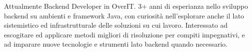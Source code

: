 

\begin{cvparagraph}
	
	Attualmente Backend Developer in OverIT. 3+ anni di esperianza nello sviluppo backend su ambienti e framework Java, con curiosità nell'esplorare anche il lato sistemistico ed infrastrutturale delle soluzioni su cui lavoro. Interessato ad escogitare ed applicare metodi migliori di risoluzione per compiti impegnativi, e ad imparare nuove tecnologie e strumenti lato backend quando necessario.
\end{cvparagraph}